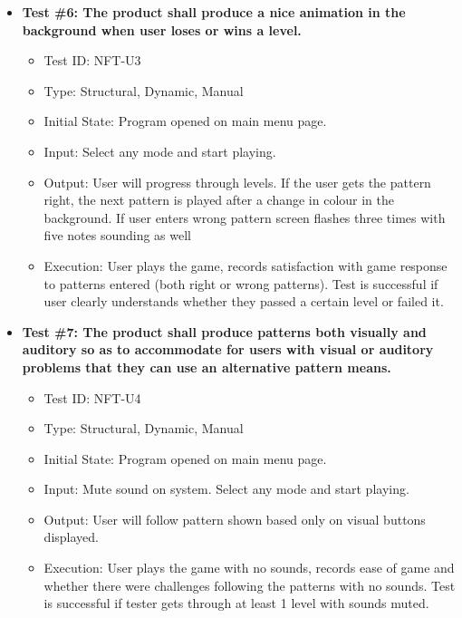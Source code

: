 \documentclass[12pt, titlepage]{article}
\begin{document}
\begin{itemize}
\item \textbf{Test \#6: The product shall produce a nice animation in the background when user loses or wins a level.}
\begin{itemize}
\item Test ID: NFT-U3
\item Type: Structural, Dynamic, Manual				
\item Initial State: Program opened on main menu page.		
\item Input: Select any mode and start playing.
\item Output: User will progress through levels. If the user gets the pattern right, the next pattern is played after a change in colour in the background. If user enters wrong pattern screen flashes three times with five notes sounding as well
\item Execution: User plays the game, records satisfaction with game response to patterns entered (both right or wrong patterns). Test is successful if user clearly understands whether they passed a certain level or failed it.
\end{itemize}

\item \textbf{Test \#7: The product shall produce patterns both visually and auditory so as to accommodate for users with visual or auditory problems that they can use an alternative pattern means.}
\begin{itemize}
\item Test ID: NFT-U4
\item Type: Structural, Dynamic, Manual				
\item Initial State: Program opened on main menu page.		
\item Input: Mute sound on system. Select any mode and start playing.
\item Output: User will follow pattern shown based only on visual buttons displayed.
\item Execution: User plays the game with no sounds, records ease of game and whether there were challenges following the patterns with no sounds. Test is successful if tester gets through at least 1 level with sounds muted.
\end{itemize}
\end{itemize}
\end{document}
